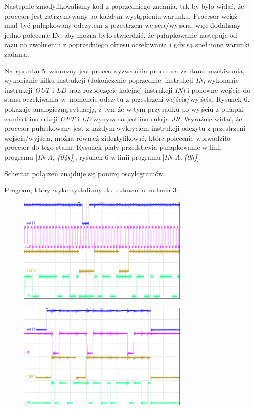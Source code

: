 \documentclass[fleqn]{article}
\begin{document}
Następnie zmodyfikowaliśmy kod z poprzedniego zadania, tak by było widać, że procesor jest zatrzymywany po każdym wystąpieniu warunku. Procesor wciąż miał być pułapkowany odczytem z przestrzeni wejścia/wyjścia, więc dodaliśmy jedno polecenie IN, aby można było stwierdzić, że pułapkowanie następuje od razu po zwolnieniu z poprzedniego okresu oczekiwania i gdy są spełnione warunki zadania.

Na rysunku $5$. widoczny jest proces wyzwalania procesora ze stanu oczekiwania, wykonianie kilku instrukcji (dokończenie poprzedniej instrukcji \textit{IN}, wykonanie instrukcji \textit{OUT} i \textit{LD} oraz rozpoczęcie kolejnej instrukcji \textit{IN}) i ponowne wejście do stanu oczekiwania w momencie odczytu z przestrzeni wejścia/wyjścia. Rysunek $6$. pokazuje analogiczną sytuację, z tym że w tym przypadku po wyjściu z pułapki zamiast instrukcji \textit{OUT} i \textit{LD} wynywana jest instrukcja \textit{JR}.
Wyraźnie widać, że procesor pułapkowany jest z każdym wykryciem instrukcji odczytu z przestrzeni wejścia/wyjścia, można również zidentyfikować, które polecenie wprwadziło procesor do tego stanu. Rysunek piąty przedstawia pułapkowanie w linii programu [\textit{IN A, (04h)}], rysunek 6 w linii programu [\textit{IN A, (0h)}].

Schemat połączeń znajduje się poniżej oscylogramów.

Program, który wykorzystaliśmy do testowania zadania 3:



\begin{figure}[H]
	\centering
	\includegraphics[width=0.75\textwidth]{img/3a.png}
	\caption{}
\end{figure}

\begin{figure}[H]
	\centering
	\includegraphics[width=0.75\textwidth]{img/3b.png}
	\caption{}
\end{figure}
\end{document}
